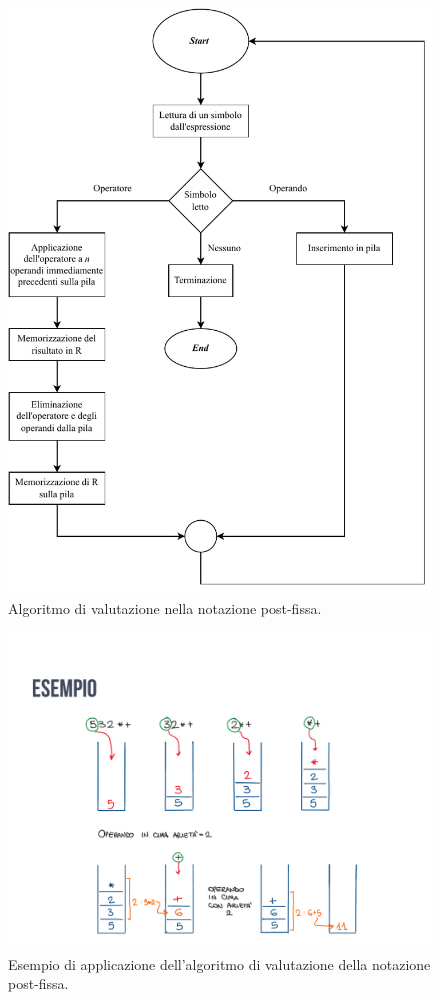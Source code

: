 \documentclass[a4paper]{article}
\begin{document}
	\begin{figure}[!htp]
		\centering
		\includegraphics[width=\textwidth]{img/algoritmo_notazione_post-fissa.pdf}
		\caption{Algoritmo di valutazione nella notazione post-fissa.}
	\end{figure}\newpage

	\begin{figure}[!htp]
		\centering
		\includegraphics[width=\textwidth]{img/esempio_notazione_post-fissa.pdf}
		\caption{Esempio di applicazione dell'algoritmo di valutazione della notazione post-fissa.}
	\end{figure}\newpage
	
\end{document}
